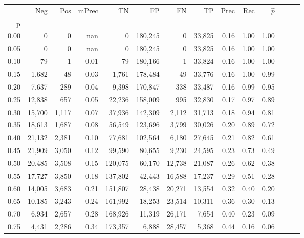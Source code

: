 \begin{tabular}{rrrrrrrrrrrrrr}
\toprule
{} &     Neg &    Pos & mPrec &       TN &       FP &      FN &      TP &  Prec &   Rec & $\hat{p}$ \\
p    &         &        &       &          &          &         &         &       &       &           \\
\midrule
0.00 &       0 &      0 &   nan &        0 &  180,245 &       0 &  33,825 &  0.16 &  1.00 &      1.00 \\
0.05 &       0 &      0 &   nan &        0 &  180,245 &       0 &  33,825 &  0.16 &  1.00 &      1.00 \\
0.10 &      79 &      1 &  0.01 &       79 &  180,166 &       1 &  33,824 &  0.16 &  1.00 &      1.00 \\
0.15 &   1,682 &     48 &  0.03 &    1,761 &  178,484 &      49 &  33,776 &  0.16 &  1.00 &      0.99 \\
0.20 &   7,637 &    289 &  0.04 &    9,398 &  170,847 &     338 &  33,487 &  0.16 &  0.99 &      0.95 \\
0.25 &  12,838 &    657 &  0.05 &   22,236 &  158,009 &     995 &  32,830 &  0.17 &  0.97 &      0.89 \\
0.30 &  15,700 &  1,117 &  0.07 &   37,936 &  142,309 &   2,112 &  31,713 &  0.18 &  0.94 &      0.81 \\
0.35 &  18,613 &  1,687 &  0.08 &   56,549 &  123,696 &   3,799 &  30,026 &  0.20 &  0.89 &      0.72 \\
0.40 &  21,132 &  2,381 &  0.10 &   77,681 &  102,564 &   6,180 &  27,645 &  0.21 &  0.82 &      0.61 \\
0.45 &  21,909 &  3,050 &  0.12 &   99,590 &   80,655 &   9,230 &  24,595 &  0.23 &  0.73 &      0.49 \\
0.50 &  20,485 &  3,508 &  0.15 &  120,075 &   60,170 &  12,738 &  21,087 &  0.26 &  0.62 &      0.38 \\
0.55 &  17,727 &  3,850 &  0.18 &  137,802 &   42,443 &  16,588 &  17,237 &  0.29 &  0.51 &      0.28 \\
0.60 &  14,005 &  3,683 &  0.21 &  151,807 &   28,438 &  20,271 &  13,554 &  0.32 &  0.40 &      0.20 \\
0.65 &  10,185 &  3,243 &  0.24 &  161,992 &   18,253 &  23,514 &  10,311 &  0.36 &  0.30 &      0.13 \\
0.70 &   6,934 &  2,657 &  0.28 &  168,926 &   11,319 &  26,171 &   7,654 &  0.40 &  0.23 &      0.09 \\
0.75 &   4,431 &  2,286 &  0.34 &  173,357 &    6,888 &  28,457 &   5,368 &  0.44 &  0.16 &      0.06 \\

\end{tabular}
